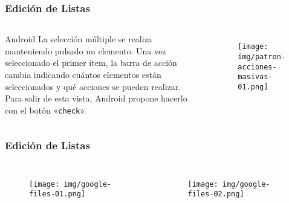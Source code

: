 \documentclass{beamer}
\begin{document}

\begin{frame}
\frametitle{Edición de Listas}

\begin{columns}[c] %

\begin{block}{Android}
\justify
La selección múltiple se realiza manteniendo pulsado un elemento. Una vez seleccionado el primer ítem, la barra de acción cambia indicando cuántos elementos están seleccionados y qué acciones se pueden realizar. Para salir de esta vista, Android propone hacerlo con el botón «\texttt{check}».
\end{block}

\begin{figure}[H]
  \centering
  \texttt{[image: img/patron-acciones-masivas-01.png]}
\end{figure}
\end{columns}
\end{frame}


\begin{frame}
\frametitle{Edición de Listas}

\begin{columns}[c] %

\begin{figure}[H]
  \centering
  \texttt{[image: img/google-files-01.png]}
\end{figure}

\begin{figure}[H]
  \centering
  \texttt{[image: img/google-files-02.png]}
\end{figure}

\end{columns}
\end{frame}

\end{document}
